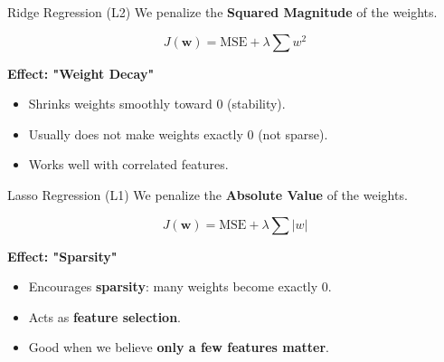\begin{frame}{Ridge Regression (L2)}
    We penalize the \textbf{Squared Magnitude} of the weights.
    
    \begin{tcolorbox}[colback=blue!5, title=\textbf{Objective Function}]
        $$ J(\mathbf{w}) = \text{MSE} + \lambda \sum w^2 $$
    \end{tcolorbox}
    
    \textbf{Effect: "Weight Decay"}
    \begin{itemize}
        \item Shrinks weights smoothly toward 0 (stability).
        \item Usually does not make weights exactly 0 (not sparse).
        \item Works well with correlated features.
    \end{itemize}
\end{frame}

\begin{frame}{Lasso Regression (L1)}
    We penalize the \textbf{Absolute Value} of the weights.
    
    \begin{tcolorbox}[colback=red!5, title=\textbf{Objective Function}]
        $$ J(\mathbf{w}) = \text{MSE} + \lambda \sum |w| $$
    \end{tcolorbox}
    
    \textbf{Effect: "Sparsity"}
    \begin{itemize}
        \item Encourages \textbf{sparsity}: many weights become exactly 0.
        \item Acts as \textbf{feature selection}.
        \item Good when we believe \textbf{only a few features matter}.
    \end{itemize}
\end{frame}

